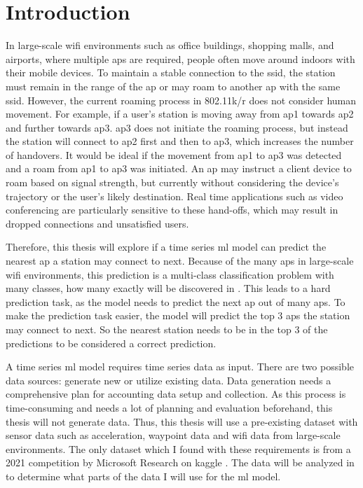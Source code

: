 \chapter{Introduction}\label{sec:intro}

In large-scale \ac{wifi} environments such as office buildings, shopping malls, and airports, where multiple \acp{ap} are required, people often move around indoors with their mobile devices.
To maintain a stable connection to the \ac{ssid}, the station must remain in the range of the \ac{ap} or may roam to another \ac{ap} with the same \ac{ssid}.
However, the current roaming process in 802.11k/r\cite{802.11k}\cite{802.11r} does not consider human movement.
For example, if a user's station is moving away from \ac{ap}1 towards \ac{ap}2 and further towards \ac{ap}3.
\ac{ap}3 does not initiate the roaming process, but instead the station will connect to \ac{ap}2 first and then to \ac{ap}3, which increases the number of handovers.
It would be ideal if the movement from \ac{ap}1 to \ac{ap}3 was detected and a roam from \ac{ap}1 to \ac{ap}3 was initiated.
An \ac{ap} may instruct a client device to roam based on signal strength, but currently without considering the device's trajectory or the user's likely destination.
Real time applications such as video conferencing are particularly sensitive to these hand-offs, which may result in dropped connections and unsatisfied users.

Therefore, this thesis will explore if a time series \ac{ml} model can predict the nearest \ac{ap} a station may connect to next.
Because of the many \acp{ap} in large-scale \ac{wifi} environments, this prediction is a multi-class classification problem with many classes, how many exactly will be discovered in .
This leads to a hard prediction task, as the model needs to predict the next \ac{ap} out of many \acp{ap}.
To make the prediction task easier, the model will predict the top 3 \acp{ap} the station may connect to next.
So the nearest station needs to be in the top 3 of the predictions to be considered a correct prediction.

A time series \ac{ml} model requires time series data as input.
There are two possible data sources: generate new or utilize existing data. 
Data generation needs a comprehensive plan for accounting data setup and collection.
As this process is time-consuming and needs a lot of planning and evaluation beforehand, this thesis will not generate data.
Thus, this thesis will use a pre-existing dataset with sensor data such as acceleration, waypoint data and \ac{wifi} data from large-scale environments.
The only dataset which I found with these requirements is from a 2021 competition by Microsoft Research \cite{IndoorLocationNavigation} on kaggle \cite{kaggle}.
The data will be analyzed in  to determine what parts of the data I will use for the \ac{ml} model.

